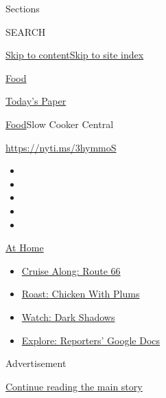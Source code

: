 Sections

SEARCH

\protect\hyperlink{site-content}{Skip to
content}\protect\hyperlink{site-index}{Skip to site index}

\href{https://www.nytimes3xbfgragh.onion/section/food}{Food}

\href{https://myaccount.nytimes3xbfgragh.onion/auth/login?response_type=cookie\&client_id=vi}{}

\href{https://www.nytimes3xbfgragh.onion/section/todayspaper}{Today's
Paper}

\href{/section/food}{Food}\textbar{}Slow Cooker Central

\url{https://nyti.ms/3hymmoS}

\begin{itemize}
\item
\item
\item
\item
\item
\end{itemize}

\href{https://www.nytimes3xbfgragh.onion/spotlight/at-home?action=click\&pgtype=Article\&state=default\&region=TOP_BANNER\&context=at_home_menu}{At
Home}

\begin{itemize}
\tightlist
\item
  \href{https://www.nytimes3xbfgragh.onion/2020/09/07/travel/route-66.html?action=click\&pgtype=Article\&state=default\&region=TOP_BANNER\&context=at_home_menu}{Cruise
  Along: Route 66}
\item
  \href{https://www.nytimes3xbfgragh.onion/2020/09/04/dining/sheet-pan-chicken.html?action=click\&pgtype=Article\&state=default\&region=TOP_BANNER\&context=at_home_menu}{Roast:
  Chicken With Plums}
\item
  \href{https://www.nytimes3xbfgragh.onion/2020/09/04/arts/television/dark-shadows-stream.html?action=click\&pgtype=Article\&state=default\&region=TOP_BANNER\&context=at_home_menu}{Watch:
  Dark Shadows}
\item
  \href{https://www.nytimes3xbfgragh.onion/interactive/2020/at-home/even-more-reporters-editors-diaries-lists-recommendations.html?action=click\&pgtype=Article\&state=default\&region=TOP_BANNER\&context=at_home_menu}{Explore:
  Reporters' Google Docs}
\end{itemize}

Advertisement

\protect\hyperlink{after-top}{Continue reading the main story}

